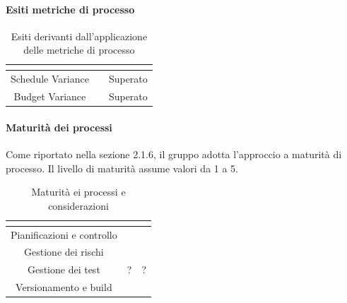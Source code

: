 \paragraph{Esiti metriche di processo} \Spazio
\renewcommand{\arraystretch}{1.5}
\begin{table}[H]
	\begin{center}
		\begin{tabular}{|c|c|c|}
			\hline
			\rowcolor{title_row}
			\textbf{\color{title_text}{Documento}} & \textbf{\color{title_text}{Valore ottenuto}} & \textbf{\color{title_text}{Esito}} \\
			\hline
			{Schedule Variance} & {} & {Superato}\\	
			\hline
			{Budget Variance} & {} & {Superato}\\	
			\hline
		\end{tabular}
		\caption[Esiti metriche di processo, Analisi]{Esiti derivanti dall'applicazione delle metriche di processo}	
		\label{tabella: esiti derivanti dall'applicazione delle metriche di processo}
	\end{center}
\end{table}

\paragraph{Maturità dei processi} \Spazio
Come riportato nella sezione 2.1.6, il gruppo adotta l'approccio a maturità di processo. Il livello di maturità assume valori da 1 a 5.
\renewcommand{\arraystretch}{1.5}
\begin{table}[H]
	\begin{center}
		\begin{tabular}{|c|c|c|}
			\hline
			\rowcolor{title_row}
			\textbf{\color{title_text}{Processo}} & \textbf{\color{title_text}{Livello di maturità}} & \textbf{\color{title_text}{Considerazioni}} \\
			\hline
			{Pianificazioni e controllo} & {} & {}\\	
			\hline
			{Gestione dei rischi} & {} & {}\\	
			\hline
			{Gestione dei test} & {?} & {?}\\	
			\hline
			{Versionamento e build} & {} & {}\\	
			\hline
			
		\end{tabular}
		\caption[Maturità dei processi, Analisi]{Maturità ei processi e considerazioni}	
		\label{tabella: considerazioni sulla maturità dei processi raggiunta}
	\end{center}
\end{table}


